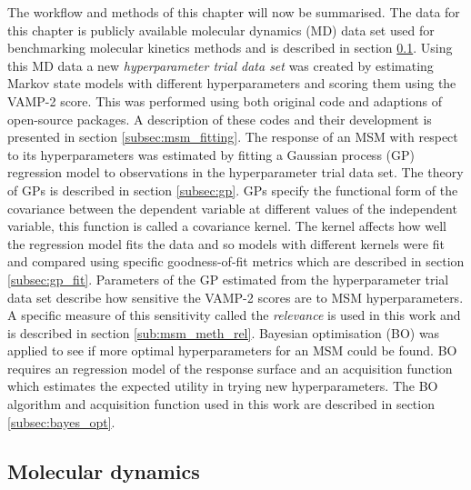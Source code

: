 The workflow and methods of this chapter will now be summarised.  The data for this chapter is publicly available molecular dynamics (MD) data set used for benchmarking molecular kinetics methods and is described in section \ref{sec:msm_md}.  Using this MD data a new \emph{hyperparameter trial data set} was created by estimating Markov state models with different hyperparameters and scoring them using the VAMP-2 score. This was performed using both original code and adaptions of open-source packages.  A description of these codes and their development is presented in section \ref{subsec:msm_fitting}.  The response of an MSM with respect to its hyperparameters was estimated by fitting a  Gaussian process (GP) regression model to observations in the hyperparameter trial data set.  The theory of GPs is described in section \ref{subsec:gp}. GPs specify the functional form of the covariance between the dependent variable at different values of the independent variable, this function is called a covariance kernel. The kernel affects how well the regression model fits the data and so models with different kernels were fit and compared using  specific goodness-of-fit metrics which are described in section \ref{subsec:gp_fit}. Parameters of the GP estimated from the hyperparameter trial data set describe how sensitive the VAMP-2 scores are to MSM hyperparameters. A specific measure of this sensitivity called the \emph{relevance} is used in this work and is described in section \ref{sub:msm_meth_rel}.  Bayesian optimisation (BO) was applied to see if more optimal hyperparameters for an MSM could be found. BO requires an regression model of the response surface and an acquisition function which estimates the expected utility in trying new hyperparameters. The BO algorithm and acquisition function used in this work are described in section \ref{subsec:bayes_opt}.   

\subsection{Molecular dynamics}\label{sec:msm_md}


